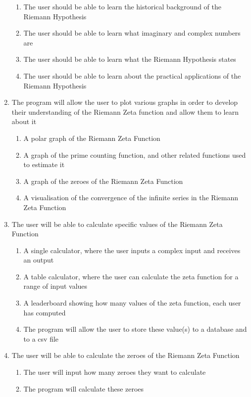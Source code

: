 \documentclass{article}
\begin{document}
\begin{enumerate}
    \begin{enumerate}
        \item The user should be able to learn the historical background of the Riemann Hypothesis
        \item The user should be able to learn what imaginary and complex numbers are
        \item The user should be able to learn what the Riemann Hypothesis states
        \item The user should be able to learn about the practical applications of the Riemann Hypothesis
    \end{enumerate}
    \item The program will allow the user to plot various graphs in order to develop their understanding of the Riemann Zeta function and allow them to learn about it
    \begin{enumerate}
        \item A polar graph of the Riemann Zeta Function
        \item A graph of the prime counting function, and other related functions used to estimate it
        \item A graph of the zeroes of the Riemann Zeta Function
        \item A visualisation of the convergence of the infinite series in the Riemann Zeta Function
    \end{enumerate}
    \item The user will be able to calculate specific values of the Riemann Zeta Function
    \begin{enumerate}
        \item A single calculator, where the user inputs a complex input and receives an output
        \item A table calculator, where the user can calculate the zeta function for a range of input values
        \item A leaderboard showing how many values of the zeta function, each user has computed
        \item The program will allow the user to store these value(s) to a database and to a csv file
    \end{enumerate}
    \item The user will be able to calculate the zeroes of the Riemann Zeta Function
    \begin{enumerate}
        \item The user will input how many zeroes they want to calculate
        \item The program will calculate these zeroes

\end{enumerate}
\end{enumerate}
\end{document}
